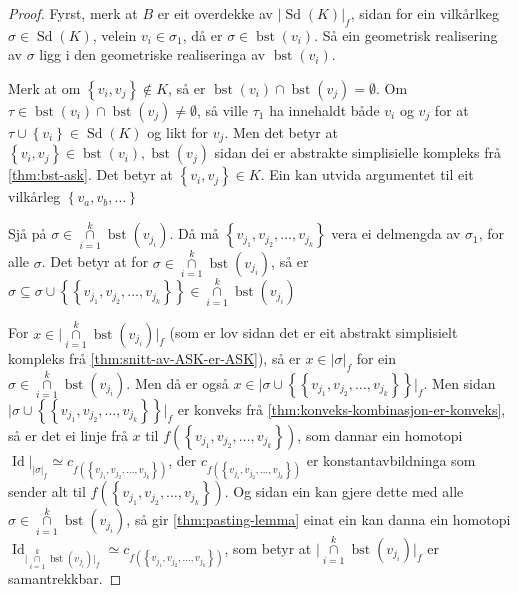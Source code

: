 \documentclass[a4paper, 12pt, norsk]{article}
\theoremstyle{plain}
\theoremstyle{definition}
\newcommand{\intersect}{ \mathop{\cap}\limits }
\newcommand{\union}{ \mathop{\cup}\limits }
\newcommand{\gr}[1]{ \lvert #1 \rvert } %
\newcommand{\set}[1]{ \left\{ #1 \right\} } %
\DeclareMathOperator{\Sd}{Sd} %
\DeclareMathOperator{\bst}{bst} %
\DeclareMathOperator{\Id}{Id} %
\begin{document}
\begin{proof}
	Fyrst, merk at \( B \) er eit overdekke av \( \gr{\Sd(K)}_f \), sidan for ein vilkårlkeg \( \sigma \in \Sd(K) \), velein \( v_i \in \sigma_1 \), då er \( \sigma \in \bst(v_i) \). Så ein geometrisk realisering av \( \sigma \) ligg i den geometriske realiseringa av \( \bst(v_i) \).

	Merk at om \( \set{v_i, v_j} \not\in K \), så er \( \bst(v_i) \intersect \bst(v_j) = \emptyset \). Om \( \tau \in \bst(v_i) \intersect \bst(v_j) \neq \emptyset \), så ville \( \tau_1 \) ha innehaldt både \( v_i \) og \( v_j \) for at \( \tau \union \set{v_i} \in \Sd(K) \) og likt for \( v_j \). Men det betyr at \( \set{v_i, v_j} \in \bst(v_i), \bst(v_j) \) sidan dei er abstrakte simplisielle kompleks frå \autoref{thm:bst-ask}. Det betyr at \( \set{v_i, v_j} \in K \). Ein kan utvida argumentet til eit vilkårleg \( \set{v_a, v_b, \dots} \)

	Sjå på \( \sigma \in \intersect_{i = 1}^k \bst(v_{j_i}) \). Då må \( \set{v_{j_1}, v_{j_2}, \dots, v_{j_k}} \) vera ei delmengda av \( \sigma_1 \), for alle \( \sigma \). Det betyr at for \( \sigma \in \intersect_{i = 1}^k \bst(v_{j_i}) \), så er \( \sigma \subseteq \sigma \union \set{\set{v_{j_1}, v_{j_2}, \dots, v_{j_k}}} \in \intersect_{i = 1}^k \bst(v_{j_i}) \)

	For \(x \in \gr{\intersect_{i = 1}^k \bst(v_{j_i})}_f \) (som er lov sidan det er eit abstrakt simplisielt kompleks frå \autoref{thm:snitt-av-ASK-er-ASK}), så er \( x \in \gr{\sigma}_f \) for ein \( \sigma \in \intersect_{i = 1}^k \bst(v_{j_i}) \). Men då er også \( x \in \gr{\sigma \union \set{\set{v_{j_1}, v_{j_2}, \dots, v_{j_k}}}}_f \). Men sidan \( \gr{\sigma \union \set{\set{v_{j_1}, v_{j_2}, \dots, v_{j_k}}}}_f \) er konveks frå \autoref{thm:konveks-kombinasjon-er-konveks}, så er det ei linje frå \( x \) til \( f(\set{v_{j_1}, v_{j_2}, \dots, v_{j_k}}) \), som dannar ein homotopi \( \Id|_{\gr{\sigma}_f} \simeq c_{f(\set{v_{j_1}, v_{j_2}, \dots, v_{j_k}})} \), der \( c_{f(\set{v_{j_1}, v_{j_2}, \dots, v_{j_k}})} \) er konstantavbildninga som sender alt til \( f(\set{v_{j_1}, v_{j_2}, \dots, v_{j_k}}) \). Og sidan ein kan gjere dette med alle \( \sigma \in \intersect_{i = 1}^k \bst(v_{j_i}) \), så gir \autoref{thm:pasting-lemma} einat ein kan danna ein homotopi \( \Id_{\gr{\intersect_{i = 1}^k \bst(v_{j_i})}_f} \simeq c_{f(\set{v_{j_1}, v_{j_2}, \dots, v_{j_k}})} \), som betyr at \( \gr{\intersect_{i = 1}^k \bst(v_{j_i})}_f \) er samantrekkbar.
\end{proof}
\end{document}
